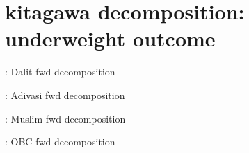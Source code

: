 \documentclass{article}
\begin{document}



\newpage
\section{kitagawa decomposition: underweight outcome}


\begin{table}[H]
    \centering
    \footnotesize %
    \caption{: Dalit fwd decomposition}
    \label{tab:sumstat}
\end{table}

\begin{table}[H]
    \centering
    \footnotesize %
    \caption{: Adivasi fwd decomposition}
    \label{tab:sumstat}
\end{table}



\begin{table}[H]
    \centering
    \footnotesize %
    \caption{: Muslim fwd decomposition}
    \label{tab:sumstat}
\end{table}

\begin{table}[H]
    \centering
    \footnotesize %
    \caption{: OBC fwd decomposition}
    \label{tab:sumstat}
\end{table}


\end{document}
